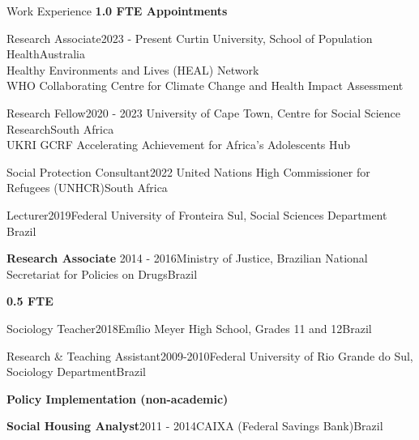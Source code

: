 \begin{rSection}{Work Experience}
\large \diamondsep{} \textbf {1.0 FTE Appointments}

\begin{rSubsection}
{Research Associate}{2023 - Present}
{Curtin University, School of Population Health}{Australia}\\
Healthy Environments and Lives (HEAL) Network\\
WHO Collaborating Centre for Climate Change and Health Impact Assessment
\end{rSubsection}

\begin{rSubsection}
{Research Fellow}{2020 - 2023}
{University of Cape Town, Centre for Social Science Research}{South Africa}\\
UKRI GCRF Accelerating Achievement for Africa's Adolescents Hub
\end{rSubsection}

\begin{rSubsection}
{Social Protection Consultant}{2022}
{United Nations High Commissioner for Refugees (UNHCR)}{South Africa}\par
\end{rSubsection}

\begin{rSubsection}{Lecturer}{2019}{Federal University of Fronteira Sul, Social Sciences Department} {Brazil}\par
\end{rSubsection}

\begin{rSubsection}{\textbf{Research Associate}}{ 2014 - 2016}{Ministry of Justice, Brazilian National Secretariat for Policies on Drugs}{Brazil}\par
\end{rSubsection}

\vspace{1em}
\large \diamondsep{} \textbf {0.5 FTE}
\par

\begin{rSubsection}{Sociology Teacher}{2018}{Emílio Meyer High School, Grades 11 and 12}{Brazil}\par
\end{rSubsection}

\begin{rSubsection}{Research \& Teaching Assistant}{2009-2010}{Federal University of Rio Grande do Sul, Sociology Department}{Brazil}\par
\end{rSubsection}

\vspace{1em}
\large  \diamondsep{}\textbf{Policy Implementation (non-academic)}
\par
\begin{rSubsection}{\textbf{Social Housing Analyst}}{2011 -  2014}{CAIXA (Federal Savings Bank)}{Brazil}\par

\end{rSubsection}
\end{rSection}